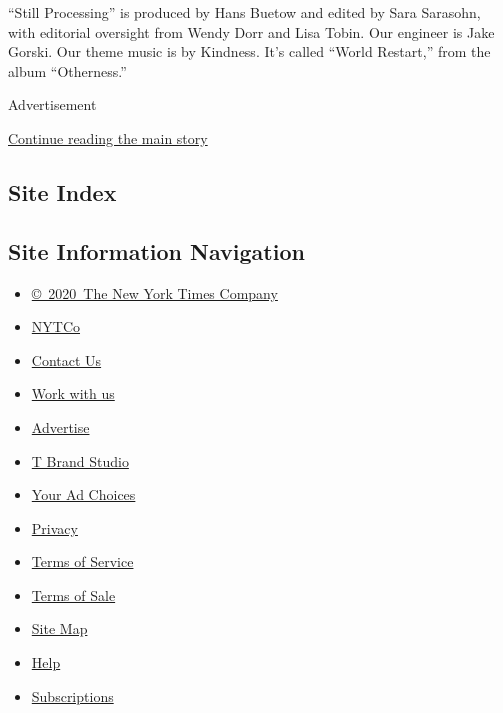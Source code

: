``Still Processing'' is produced by Hans Buetow and edited by Sara
Sarasohn, with editorial oversight from Wendy Dorr and Lisa Tobin. Our
engineer is Jake Gorski. Our theme music is by Kindness. It's called
``World Restart,'' from the album ``Otherness.''

Advertisement

\protect\hyperlink{after-bottom}{Continue reading the main story}

\hypertarget{site-index}{%
\subsection{Site Index}\label{site-index}}

\hypertarget{site-information-navigation}{%
\subsection{Site Information
Navigation}\label{site-information-navigation}}

\begin{itemize}
\tightlist
\item
  \href{https://help.nytimes.com/hc/en-us/articles/115014792127-Copyright-notice}{©~2020~The
  New York Times Company}
\end{itemize}

\begin{itemize}
\tightlist
\item
  \href{https://www.nytco.com/}{NYTCo}
\item
  \href{https://help.nytimes.com/hc/en-us/articles/115015385887-Contact-Us}{Contact
  Us}
\item
  \href{https://www.nytco.com/careers/}{Work with us}
\item
  \href{https://nytmediakit.com/}{Advertise}
\item
  \href{http://www.tbrandstudio.com/}{T Brand Studio}
\item
  \href{https://www.nytimes.com/privacy/cookie-policy\#how-do-i-manage-trackers}{Your
  Ad Choices}
\item
  \href{https://www.nytimes.com/privacy}{Privacy}
\item
  \href{https://help.nytimes.com/hc/en-us/articles/115014893428-Terms-of-service}{Terms
  of Service}
\item
  \href{https://help.nytimes.com/hc/en-us/articles/115014893968-Terms-of-sale}{Terms
  of Sale}
\item
  \href{https://spiderbites.nytimes.com}{Site Map}
\item
  \href{https://help.nytimes.com/hc/en-us}{Help}
\item
  \href{https://www.nytimes.com/subscription?campaignId=37WXW}{Subscriptions}
\end{itemize}
